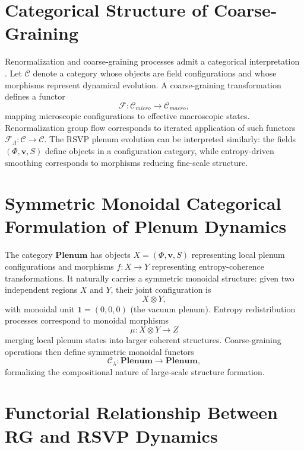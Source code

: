 \documentclass[12pt,a4paper]{article}
\theoremstyle{plain}
\theoremstyle{definition}
\theoremstyle{remark}
\begin{document}
\section{Categorical Structure of Coarse-Graining}

Renormalization and coarse-graining processes admit a categorical
interpretation \cite{LurieTFT,CostelloGwilliam}. Let $\mathcal{C}$
denote a category whose objects are field configurations and whose
morphisms represent dynamical evolution. A coarse-graining
transformation defines a functor
\begin{equation}
\mathcal{F} : \mathcal{C}_{micro} \rightarrow \mathcal{C}_{macro},
\end{equation}
mapping microscopic configurations to effective macroscopic states.
Renormalization group flow corresponds to iterated application of
such functors $\mathcal{F}_\Lambda : \mathcal{C} \rightarrow \mathcal{C}$.
The RSVP plenum evolution can be interpreted similarly: the fields
$(\Phi,\mathbf{v},S)$ define objects in a configuration category,
while entropy-driven smoothing corresponds to morphisms reducing
fine-scale structure.

\section{Symmetric Monoidal Categorical Formulation of Plenum Dynamics}

The category $\mathbf{Plenum}$ has objects $X = (\Phi,\mathbf{v},S)$
representing local plenum configurations and morphisms $f: X \to Y$
representing entropy-coherence transformations. It naturally carries
a symmetric monoidal structure: given two independent regions $X$ and
$Y$, their joint configuration is
\begin{equation}
X \otimes Y,
\end{equation}
with monoidal unit $\mathbf{1} = (0,0,0)$ (the vacuum plenum).
Entropy redistribution processes correspond to monoidal morphisms
\begin{equation}
\mu : X \otimes Y \rightarrow Z
\end{equation}
merging local plenum states into larger coherent structures.
Coarse-graining operations then define symmetric monoidal functors
\begin{equation}
\mathcal{C}_\lambda : \mathbf{Plenum} \rightarrow \mathbf{Plenum},
\end{equation}
formalizing the compositional nature of large-scale structure
formation.

\section{Functorial Relationship Between RG and RSVP Dynamics}
\end{document}

